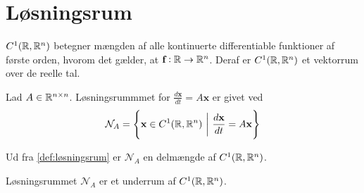 \section{Løsningsrum}

$C^1(\mathbb{R},\mathbb{R}^n)$ betegner mængden af alle kontinuerte differentiable funktioner af første orden, hvorom det gælder, at $\textbf{f}: \mathbb{R} \to \mathbb{R}^n$. Deraf er $C^1(\mathbb{R},\mathbb{R}^n)$ et vektorrum over de reelle tal. 

\begin{defn}\textbf{}\label{def:løsningsrum}
\newline
Lad $A \in \mathbb{R}^{n \times n}$. Løsningsrummmet for $\displaystyle\frac{d\textbf{x}}{dt}=A\textbf{x}$ er givet ved 
%
\begin{align}
    \mathcal{N}_A = \left\{\textbf{x} \in C^1(\R, \R^n)\ \bigg|\  \frac{d\textbf{x}}{dt}=A\textbf{x}\right\}
\end{align}
%
\end{defn}
%
Ud fra \autoref{def:løsningsrum} er $\mathcal{N}_A$ en delmængde af $C^1(\mathbb{R},\mathbb{R}^n)$.  
%
\begin{thmx}\textbf{}
\newline
Løsningsrummet $\mathcal{N}_A$ er et underrum af $C^1(\mathbb{R},\mathbb{R}^n)$.
\end{thmx}
%
